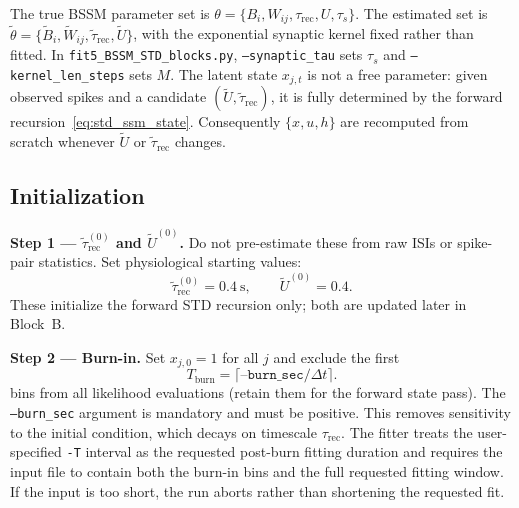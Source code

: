 \documentclass[11pt]{article}
\begin{document}
The true BSSM parameter set is
$\theta = \{B_i, W_{ij}, \tau_\text{rec}, U, \tau_s\}$. The estimated set is
$\tilde{\theta} = \{\tilde{B}_i, \tilde{W}_{ij}, \tilde{\tau}_\text{rec}, \tilde{U}\}$,
with the exponential synaptic kernel fixed rather than fitted. In
\texttt{fit5\_BSSM\_STD\_blocks.py}, \texttt{--synaptic\_tau} sets $\tau_s$ and
\texttt{--kernel\_len\_steps} sets $M$. The latent state $x_{j,t}$ is not a free
parameter: given observed spikes and a candidate
$(\tilde{U},\tilde{\tau}_\text{rec})$, it is fully determined by the forward
recursion~\eqref{eq:std_ssm_state}. Consequently $\{x,u,h\}$ are recomputed from
scratch whenever $\tilde{U}$ or $\tilde{\tau}_\text{rec}$ changes.

\subsection{Initialization}
\label{sec:init}

\textbf{Step 1 --- $\tilde{\tau}_\text{rec}^{(0)}$ and $\tilde{U}^{(0)}$.}
Do not pre-estimate these from raw ISIs or spike-pair statistics.
Set physiological starting values:
\begin{equation}
    \tilde{\tau}_\text{rec}^{(0)} = 0.4~\text{s}, \qquad \tilde{U}^{(0)} = 0.4.
\end{equation}
These initialize the forward STD recursion only; both are updated later in
Block~B.

\textbf{Step 2 --- Burn-in.}
Set $x_{j,0}=1$ for all $j$ and exclude the first
\begin{equation}
    T_\text{burn} = \lceil \texttt{--burn\_sec}/\Delta t \rceil .
\end{equation}
bins from all likelihood evaluations (retain them for the forward state pass).
The \texttt{--burn\_sec} argument is mandatory and must be positive.
This removes sensitivity to the initial condition, which decays on timescale
$\tau_\text{rec}$.
The fitter treats the user-specified \texttt{-T} interval as the requested
post-burn fitting duration and requires the input file to contain both the
burn-in bins and the full requested fitting window. If the input is too short,
the run aborts rather than shortening the requested fit.
\end{document}
